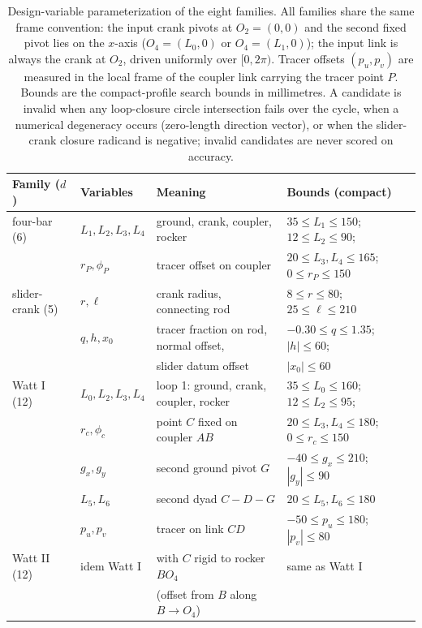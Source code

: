 \begin{table}[H]
\caption{Design-variable parameterization of the eight families. All
families share the same frame convention: the input crank pivots at
$O_2=(0,0)$ and the second fixed pivot lies on the $x$-axis
($O_4=(L_0,0)$ or $O_4=(L_1,0)$); the input link is always the crank
at $O_2$, driven uniformly over $[0,2\pi)$. Tracer offsets $(p_u,p_v)$
are measured in the local frame of the coupler link carrying the
tracer point $P$. Bounds are the compact-profile search bounds in
millimetres. A candidate is invalid when any loop-closure circle
intersection fails over the cycle, when a numerical degeneracy occurs
(zero-length direction vector), or when the slider-crank closure
radicand is negative; invalid candidates are never scored on accuracy.}
\label{tab:parameterization}
\centering
\small
\begin{tabular}{@{}llll@{}}
\hline
Family ($d$) & Variables & Meaning & Bounds (compact) \\ \hline
four-bar (6) & $L_1,L_2,L_3,L_4$ & ground, crank, coupler, rocker & $35\!\le\!L_1\!\le\!150$; $12\!\le\!L_2\!\le\!90$; \\
 & $r_P,\phi_P$ & tracer offset on coupler & $20\!\le\!L_3,L_4\!\le\!165$; $0\!\le\!r_P\!\le\!150$ \\
slider-crank (5) & $r,\ell$ & crank radius, connecting rod & $8\!\le\!r\!\le\!80$; $25\!\le\!\ell\!\le\!210$ \\
 & $q,h,x_0$ & tracer fraction on rod, normal offset, & $-0.30\!\le\!q\!\le\!1.35$; $|h|\!\le\!60$; \\
 & & slider datum offset & $|x_0|\!\le\!60$ \\
Watt I (12) & $L_0,L_2,L_3,L_4$ & loop 1: ground, crank, coupler, rocker & $35\!\le\!L_0\!\le\!160$; $12\!\le\!L_2\!\le\!95$; \\
 & $r_c,\phi_c$ & point $C$ fixed on coupler $AB$ & $20\!\le\!L_3,L_4\!\le\!180$; $0\!\le\!r_c\!\le\!150$ \\
 & $g_x,g_y$ & second ground pivot $G$ & $-40\!\le\!g_x\!\le\!210$; $|g_y|\!\le\!90$ \\
 & $L_5,L_6$ & second dyad $C\!-\!D\!-\!G$ & $20\!\le\!L_5,L_6\!\le\!180$ \\
 & $p_u,p_v$ & tracer on link $CD$ & $-50\!\le\!p_u\!\le\!180$; $|p_v|\!\le\!80$ \\
Watt II (12) & idem Watt I & with $C$ rigid to rocker $BO_4$ & same as Watt I \\
 & & (offset from $B$ along $B\!\to\!O_4$) & \\

\end{tabular}
\end{table}
